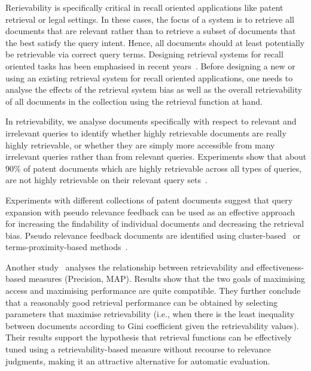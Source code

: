 Rerievability is specifically critical in recall oriented applications like patent retrieval or legal settings. In these cases, the focus of a system is to retrieve all documents that are relevant rather than to retrieve a subset of documents that the best satisfy the query intent.
Hence, all documents should at least potentially be retrievable via correct query terms. Designing retrieval systems for recall oriented tasks has been emphasised in recent years~\citep{fujii2007introduction, kontostathis2008effect}. Before designing a new or using an existing retrieval system for recall oriented applications, one needs to analyse the effects of the retrieval system bias as well as the overall retrievability of all documents in the collection using the retrieval function at hand.

In retrievability, we analyse documents specifically with respect to relevant and irrelevant queries to identify whether highly retrievable documents are really highly retrievable, or whether they are simply more accessible from many irrelevant queries rather than from relevant queries. Experiments show that about 90\% of patent documents which are highly retrievable across all types of queries, are not highly retrievable on their relevant query sets~\citep{bashir2009analyzing}.

Experiments with different collections of patent documents suggest that query expansion with pseudo relevance feedback can be used as an effective approach for increasing the findability of individual documents and decreasing the retrieval bias. Pseudo relevance feedback documents are identified using cluster-based~\citep{bashir2009improving} or terms-proximity-based methods~\citep{bashir2010improving}.

Another study~\citep{bache2010improving} analyses the relationship between retrievability and effectiveness-based measures (Precision, MAP). Results show that the two goals of maximising access and maximising performance are quite compatible. They further conclude that a reasonably good retrieval performance can be obtained by selecting parameters that maximise retrievability (i.e., when there is the least inequality between documents according to Gini coefficient given the retrievability values). Their results support the hypothesis that retrieval functions can be effectively tuned using a retrievability-based measure without recourse to relevance judgments, making it an attractive alternative for automatic evaluation.
